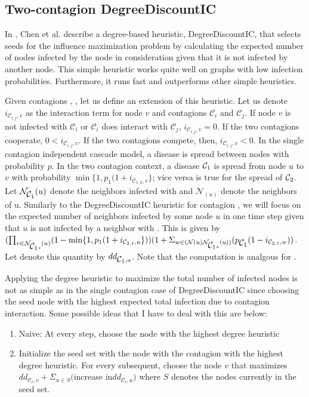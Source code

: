 \documentclass[11pt]{article}
\begin{document}
\subsection{Two-contagion DegreeDiscountIC}
In \cite{DegreeDiscount}, Chen et al. describe a degree-based heuristic, DegreeDiscountIC, that selects seeds for the influence maximization problem by calculating the expected number of nodes infected by the node in consideration given that it is not infected by another node. This simple heuristic works quite well on graphs with low infection probabilities. Furthermore, it runs fast and outperforms other simple heuristics.

Given contagions \cone{}, \ctwo{}, let us define an extension of this heuristic. Let us denote $i_{\mathcal{C}_{i,j},v}$ as the interaction term for node $v$ and contagions $\mathcal{C}_{i}$ and $\mathcal{C}_{j}$. If node $v$ is not infected with $\mathcal{C}_{i}$ or $\mathcal{C}_{i}$ does interact with $\mathcal{C}_{j}$, $i_{\mathcal{C}_{i,j},v} = 0$. If the two contagions cooperate, $0 < i_{\mathcal{C}_{i,j},v}$. If the two contagions compete, then, $i_{\mathcal{C}_{i,j},v} < 0$. In the single contagion independent cascade model, a disease is spread between nodes with probability $p$. In the two contagion context, a disease $\mbox{$\mathcal{C}_1$}{}$ is spread from node $u$ to $v$ with probability $\min\{1, p_{1}(1+i_{\mathcal{C}_{1,2},v}\}$; vice versa is true for the spread of $\mbox{$\mathcal{C}_2$}{}$. Let $\mathcal{N}_{\mbox{$\mathcal{C}_1$}{}}(u)$ denote the neighbors infected with \cone{} and $\mathcal{N}_(u)$ denote the neighbors of u. Similarly to the DegreeDiscountIC heuristic for contagion \cone{}, we will focus on the expected number of neighbors infected by some node $u$ in one time step given that $u$ is not infected by a neighbor with \cone{}. This is given by $(\prod_{v\in \mathcal{N}_{\mbox{$\mathcal{C}_1$}{}z}(u)}(1-\min\{1, p_{1}(1+i_{\mathcal{C}_{2,1},u}\}))(1+\Sigma_{w \in  (\mathcal{N}(u) \mathcal{N}_{\mbox{$\mathcal{C}_1$}{}z}(u))}(p_{\mbox{$\mathcal{C}_1$}{}}(1-i_{\mathcal{C}_{2,1},w}))$. Let denote this quantity by $dd_{\mbox{$\mathcal{C}_1$}{}, u}$. Note that the computation is analgous for \ctwo{}.

Applying the degree heuristic to maximize the total number of infected nodes is not as simple as in the single contagion case of DegreeDiscountIC since choosing the seed node with the highest expected total infection due to contagion interaction. Some possible ideas that I have to deal with this are below:
\begin{enumerate}
    \item Naive: At every step, choose the node with the highest degree heuristic
    \item Initialize the seed set with the node with the contagion with the highest degree heuristic. For every subsequent, choose the node $v$ that maximizes $dd_{\mathcal{C}_i,v} + \Sigma_{u\in S}($increase in$ dd_{\mathcal{C}_i,u})$ where $S$ denotes the nodes currently in the seed set.
\end{enumerate}
\end{document}
